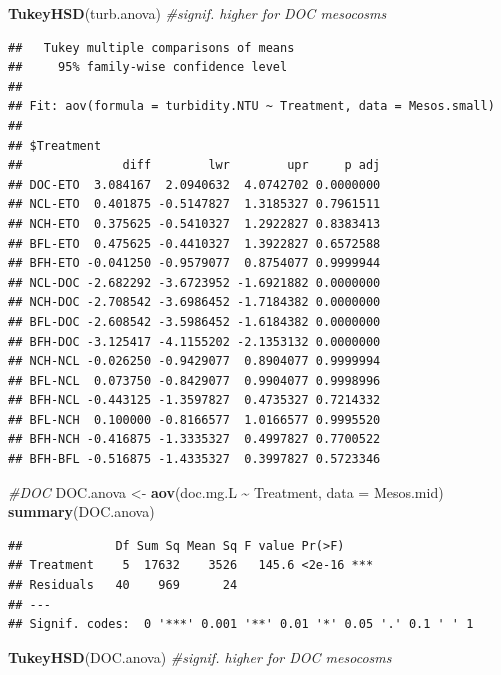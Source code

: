 \documentclass[
]{article}
\newenvironment{Shaded}{\begin{snugshade}}{\end{snugshade}}
\newcommand{\AttributeTok}[1]{\textcolor[rgb]{0.13,0.29,0.53}{#1}}
\newcommand{\CommentTok}[1]{\textcolor[rgb]{0.56,0.35,0.01}{\textit{#1}}}
\newcommand{\FunctionTok}[1]{\textcolor[rgb]{0.13,0.29,0.53}{\textbf{#1}}}
\newcommand{\NormalTok}[1]{#1}
\newcommand{\OtherTok}[1]{\textcolor[rgb]{0.56,0.35,0.01}{#1}}
\newcommand{\SpecialCharTok}[1]{\textcolor[rgb]{0.81,0.36,0.00}{\textbf{#1}}}
\begin{document}
\begin{Shaded}
\begin{Highlighting}[]
\FunctionTok{TukeyHSD}\NormalTok{(turb.anova) }\CommentTok{\#signif. higher for DOC mesocosms}
\end{Highlighting}
\end{Shaded}

\begin{verbatim}
##   Tukey multiple comparisons of means
##     95% family-wise confidence level
## 
## Fit: aov(formula = turbidity.NTU ~ Treatment, data = Mesos.small)
## 
## $Treatment
##              diff        lwr        upr     p adj
## DOC-ETO  3.084167  2.0940632  4.0742702 0.0000000
## NCL-ETO  0.401875 -0.5147827  1.3185327 0.7961511
## NCH-ETO  0.375625 -0.5410327  1.2922827 0.8383413
## BFL-ETO  0.475625 -0.4410327  1.3922827 0.6572588
## BFH-ETO -0.041250 -0.9579077  0.8754077 0.9999944
## NCL-DOC -2.682292 -3.6723952 -1.6921882 0.0000000
## NCH-DOC -2.708542 -3.6986452 -1.7184382 0.0000000
## BFL-DOC -2.608542 -3.5986452 -1.6184382 0.0000000
## BFH-DOC -3.125417 -4.1155202 -2.1353132 0.0000000
## NCH-NCL -0.026250 -0.9429077  0.8904077 0.9999994
## BFL-NCL  0.073750 -0.8429077  0.9904077 0.9998996
## BFH-NCL -0.443125 -1.3597827  0.4735327 0.7214332
## BFL-NCH  0.100000 -0.8166577  1.0166577 0.9995520
## BFH-NCH -0.416875 -1.3335327  0.4997827 0.7700522
## BFH-BFL -0.516875 -1.4335327  0.3997827 0.5723346
\end{verbatim}

\begin{Shaded}
\begin{Highlighting}[]
\CommentTok{\#DOC}
\NormalTok{DOC.anova }\OtherTok{\textless{}{-}} \FunctionTok{aov}\NormalTok{(doc.mg.L }\SpecialCharTok{\textasciitilde{}}\NormalTok{ Treatment, }\AttributeTok{data =}\NormalTok{ Mesos.mid)}
\FunctionTok{summary}\NormalTok{(DOC.anova)}
\end{Highlighting}
\end{Shaded}

\begin{verbatim}
##             Df Sum Sq Mean Sq F value Pr(>F)    
## Treatment    5  17632    3526   145.6 <2e-16 ***
## Residuals   40    969      24                   
## ---
## Signif. codes:  0 '***' 0.001 '**' 0.01 '*' 0.05 '.' 0.1 ' ' 1
\end{verbatim}

\begin{Shaded}
\begin{Highlighting}[]
\FunctionTok{TukeyHSD}\NormalTok{(DOC.anova) }\CommentTok{\#signif. higher for DOC mesocosms}
\end{Highlighting}
\end{Shaded}
\end{document}
